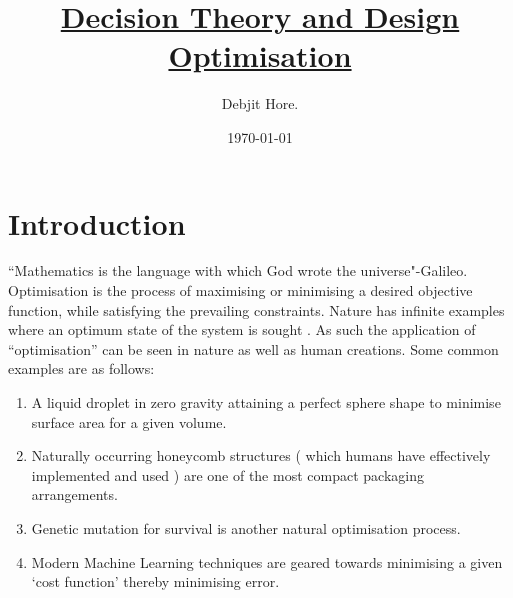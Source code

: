 \documentclass[12pt,a4paper,titlepage]{article}
\title{\Huge \underline{ Decision Theory and Design Optimisation}}
\author{Debjit Hore.}
\date{\today}
\begin{document}
\maketitle
\mbox{}

\printnomenclature

\clearpage
\tableofcontents

\clearpage
\section{Introduction}
``Mathematics is the language with which God wrote the universe"-Galileo.\\[1\baselineskip]
Optimisation is the process of maximising or minimising a desired objective function, while satisfying the prevailing constraints. Nature has infinite examples where an optimum state of the system is sought \cite{timwheeleroptimisation} . As such the application of ``optimisation'' can be seen in nature as well as human creations. Some common examples are as follows:
{\begin{enumerate}
    \item A liquid droplet in zero gravity attaining a perfect sphere shape to minimise surface area for a given volume.
    \item Naturally occurring honeycomb structures ( which humans have effectively implemented and used ) are one of the most compact packaging arrangements.\
    \item Genetic mutation for survival is another natural optimisation process.
    \item Modern Machine Learning techniques are geared towards minimising a given `cost function' thereby minimising error.
\end{enumerate}}
\end{document}
